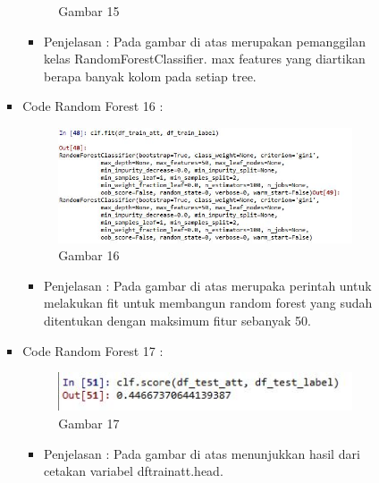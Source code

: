 \begin{enumerate}
\begin{itemize}
\begin{itemize}
\begin{itemize}
\begin{figure}[ht]
\caption{Gambar 15}
\label{contoh}
\end{figure}
\par
\begin{itemize} 
\item Penjelasan : Pada gambar di atas merupakan pemanggilan kelas RandomForestClassifier. max features yang diartikan berapa banyak kolom pada setiap tree.
\par
\par
\end{itemize}
\item Code Random Forest 16 :
\par
\begin{figure}[ht]
\centering
\includegraphics[scale=0.7]{figures/cod16.jpg}
\caption{Gambar 16}
\label{contoh}
\end{figure}
\par
\begin{itemize}
\item Penjelasan : Pada gambar di atas merupaka perintah untuk melakukan fit untuk membangun random forest yang sudah ditentukan dengan maksimum fitur sebanyak 50.
\par
\par
\end{itemize}
\item Code Random Forest 17 :
\par
\begin{figure}[ht]
\centering
\includegraphics[scale=0.7]{figures/cod18.jpg}
\caption{Gambar 17}
\label{contoh}
\end{figure}
\par
\begin{itemize}
\item Penjelasan : Pada gambar di atas menunjukkan hasil dari cetakan variabel dftrainatt.head.
\par

\end{itemize}
\end{itemize}
\end{itemize}
\end{itemize}
\end{enumerate}
